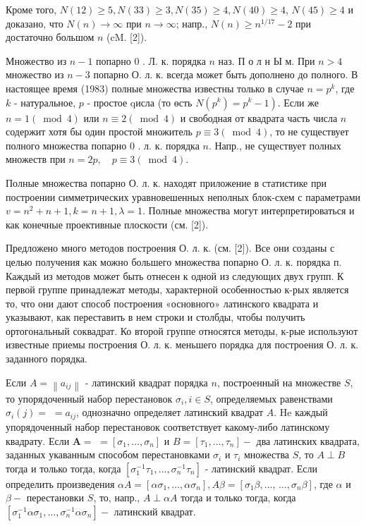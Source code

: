 \documentclass[10pt]{article}
\begin{document}
Кроме того, $N(12) \geqslant 5, N(33) \geqslant 3, N(35) \geqslant 4, N(40) \geqslant 4$, $N(45) \geqslant 4$ и доказано, что $N(n) \rightarrow \infty$ при $n \rightarrow \infty$; напр., $N(n) \geqslant n^{1 / 17}-2$ при достаточно большом $n$ (cM. [2]).

Множество из $n-1$ попарно 0 . Л. к. порядка $n$ наз. П о л н Ы м. При $n>4$ множество из $n-3$ попарно О. л. к. всегда может быть дополнено до полного. В настоящее время (1983) полные множества известны только в случае $n=p^{k}$, где $k$ - натуральное, $p$ - простое qисла (то өсть $\left.N\left(p^{k}\right)=p^{k}-1\right)$. Если же $n=1(\bmod 4)$ или $n \equiv 2(\bmod 4)$ и свободная от квадрата часть числа $n$ содержит хотя бы один простой множитель $p \equiv 3(\bmod 4)$, то не существует полного множества попарно 0 . л. к. порядка $n$. Напр., не существует полных множеств при $n=2 p, \quad p \equiv 3(\bmod 4)$.

Полные множества попарно О. л. к. находят приложение в статистике при построении симметрических уравновешенных неполных блок-схем с параметрами $v=n^{2}+n+1, k=n+1, \lambda=1$. Полные множества могут интерпретироваться и как конечные проективные плоскости (см. [2]).

Предложено много методов построения О. л. к. (см. [2]). Все они созданы с целью получения как можно большего множества попарно О. л. к. порядка п. Каждый из методов может быть отнесен к одной из следующих двух групп. К первой группе принадлежат методы, характерной особенностью к-рых является то, что они дают способ построения «основного» латинского квадрата и указывают, как переставить в нем строки и столбды, чтобы получить ортогональный соквадрат. Ко второй группе относятся методы, к-рые используют известные приемы построения О. л. к. меньшего порядка для построения О. л. к. заданного порядка.

Если $A=\left\|a_{i j}\right\|$ - латинский квадрат порядка $n$, построенный на множестве $S$, то упорядоченный набор перестановок $\sigma_{i}, i \in S$, определяемых равенствами $\sigma_{i}(j)=$ $=a_{i j}$, однозначно определяет латинский квадрат $A$. He каждый упорядоченный набор перестановок соответствует какому-либо латинскому квадрату. Если $\boldsymbol{A}=$ $=\left[\sigma_{1}, \ldots, \sigma_{n}\right]$ и $B=\left[\tau_{1}, \ldots, \tau_{n}\right]-$ два латинских квадрата, заданных укаванным способом перестановками $\sigma_{i}$ и $\tau_{i}$ множества $S$, то $A \perp B$ тогда и только тогда, когда $\left[\sigma_{1}^{-1} \tau_{1}, \ldots, \sigma_{n}^{-1} \tau_{n}\right]$ - латинский квадрат. Если определить произведения $\alpha A=\left[\alpha \sigma_{1}, \ldots, \alpha \sigma_{n}\right], A \beta=\left[\sigma_{1} \beta, \ldots\right.$, $\left.\ldots, \sigma_{n} \beta\right]$, где $\alpha$ и $\beta-$ перестановки $S$, то, напр., $A \perp \alpha A$ тогда и только тогда, когда $\left[\sigma_{1}^{-1} \alpha \sigma_{1}, \ldots, \sigma_{n}^{-1} \alpha \sigma_{n}\right]-$ латинский квадрат.
\end{document}
